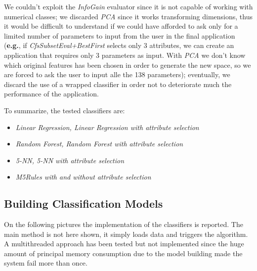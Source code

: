 We couldn’t exploit the \textit{InfoGain} evaluator since it is not capable of working with numerical classes; we discarded \textit{PCA} since it works transforming dimensions, thus it would be difficult to understand if we could have afforded to ask only for a limited number of parameters to input from the user in the final application (\textbf{e.g.}, if \textit{CfsSubsetEval+BestFirst} selects only 3 attributes, we can create an application that requires only 3 parameters as input. With \textit{PCA} we don’t know which original features has been chosen in order to generate the new space, so we are forced to ask the user to input alle the 138 parameters); eventually, we discard the use of a wrapped classifier in order not to deteriorate much the performance of the application.

To summarize, the tested classifiers are:
\begin{itemize}
	\item \textit{Linear Regression, Linear Regression with attribute selection}
	\item \textit{Random Forest, Random Forest with attribute selection}
	\item \textit{5-NN, 5-NN with attribute selection}
	\item \textit{M5Rules with and without attribute selection}
\end{itemize}




\subsection{Building Classification Models}
On the following pictures the implementation of the classifiers is reported.
The main method is not here shown, it simply loads data and triggers the algorithm. A multithreaded approach has been tested but not implemented since the huge amount of principal memory consumption due to the model building made the system fail more than once.

